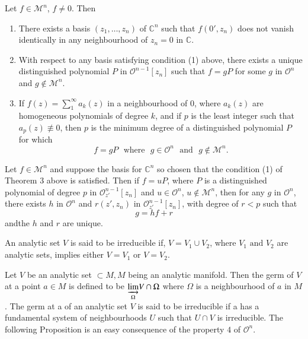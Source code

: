 \begin{theorem}\label{chap1-thm3}  
  Let $f \in \mathscr{M}^n$, $f\neq 0$. Then  
  \begin{enumerate}
  \item There exists a basis $(z_{1}, \ldots , z_{n})$ of 
    $\mathbb{C}^{n}$ such that $f(0', z_{n})$ does not vanish identically
    in any neighbourhood of $z_{n} = 0$ in $\mathbb{C}$.
 
  \item With respect to any basis satisfying condition (1) above, there
    exists a unique distinguished polynomial $P$ in $\mathscr{O}^{n-1}
    [z_{n}]$ such that $f = gP$ for some $g$ in $\mathscr{O}^{n}$ and
    $g \notin \mathscr{M}^{n}$.
 
  \item If $f(z) =  \sum \limits^{\infty}_{1} a_{k} (z)$ in a
    neighbourhood of $0$, where $a_{k}(z)$ are homogeneous polynomials
    of degree $k$, and if $p$ is the least 
integer such that $a_{p}(z)\not\equiv 0$, then $p$ is the minimum
degree of a distinguished polynomial $P$ for which 
    $$
    f = g P \text{~ where~ } g \in \mathscr{O}^{n} \text{~ and~ } g
    \not\in \mathscr{M}^{n}. 
    $$
  \end{enumerate}
\end{theorem}

\begin{theorem}\label{chap1-thm4} 
  Let $f \in \mathscr{M}^{n}$ and suppose the basis for $\mathbb{C}^{n}$ so
  chosen that the condition (1) of Theorem 3 above is satisfied. Then
  if $f = u P$, where $P$ is a distinguished polynomial of degree $p$
  in $\mathscr{O}^{n-1}_{z'}[z_{n}]$ and $u \in
  \mathscr{O}^{n}$, $u \not\in \mathscr{M}^{n}$, then for any $g$ in
  $\mathscr{O}^{n}$, there exists $h$ in $\mathscr{O}^{n}$ and
  $r(z',z_{n})$ in $\mathscr{O}^{n-1}_{z'} [z_{n}]$, with
  degree of $r < p$ such that 
  $$
  g = h f + r
  $$
  and\pageoriginale the $h$ and $r$ are unique.
\end{theorem}

\setcounter{definition}{5}
\begin{definition}\label{chap1-defin6} 
  An analytic set $V$ is said to be irreducible if, $ V = V_{1} \cup
  V_{2}$, where $V_{1} \text{ and } V_{2}$ are analytic sets, implies
  either $V = V_{1}$ or $V = V_{2}$. 
\end{definition}

Let $V$ be an analytic set $\subset M, M$ being an analytic
manifold. Then the germ of $V$ at a point $a \in M$ is defined to be
$\underset{\Omega}{\varinjlim} V \cap \Omega$ where $\Omega$ is a
neighbourhood of $a$ in $M$. The germ at a of an analytic set $V$ is
said to be irreducible if a has a fundamental system of neighbourhoods
$U$ such that $U \cap V$ is irreducible. The following Proposition is
an easy consequence of the property $4$ of $\mathscr{O}^{n}$. 


